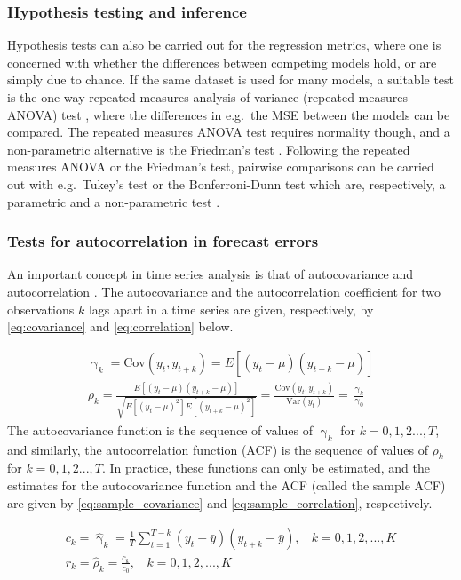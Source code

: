 \subsubsection{Hypothesis testing and inference}
Hypothesis tests can also be carried out for the regression metrics, where one is concerned with whether the differences between competing models hold, or are simply due to chance. If the same dataset is used for many models, a suitable test is the one-way repeated measures analysis of variance (repeated measures ANOVA) test \cite{Wackerly2007}, where the differences in e.g.\ the MSE between the models can be compared. The repeated measures ANOVA test requires normality though, and a non-parametric alternative is the Friedman's test \cite{Wackerly2007}. Following the repeated measures ANOVA or the Friedman's test, pairwise comparisons can be carried out with e.g.\ Tukey's test or the Bonferroni-Dunn test which are, respectively, a parametric and a non-parametric test \cite{Pereira2014}.

\subsubsection{Tests for autocorrelation in forecast errors}
\label{sec:auto_errors}
An important concept in time series analysis is that of autocovariance and autocorrelation \cite{Montgomery2015}. The autocovariance and  the autocorrelation coefficient for two observations $k$ lags apart in a time series are given, respectively, by \cref{eq:covariance} and \cref{eq:correlation} below.  

\begin{gather}
     \upgamma_k = \text{Cov}(y_t, y_{t+k}) = E[(y_t - \mu)(y_{t+k} - \mu)] \label{eq:covariance} \\[1ex]
     \rho_k = \frac{E[(y_t - \mu)(y_{t+k} - \mu)]}{\sqrt{E[(y_t - \mu)^2]E[(y_{t+k} - \mu)^2]}} = \frac{\text{Cov}(y_t, y_{t+k})}{\text{Var}(y_t)} = \frac{\upgamma_k}{\upgamma_0}\label{eq:correlation}
\end{gather}
The autocovariance function is the sequence of values of $\upgamma_k$ for $k=0,1,2 ..., T$, and similarly, the autocorrelation function (ACF) is the sequence of values of $\rho_k$ for $k=0,1,2 ..., T$. In practice, these functions can only be estimated, and the estimates for the autocovariance function and the ACF (called the sample ACF) are given by \cref{eq:sample_covariance} and \cref{eq:sample_correlation}, respectively.

\begin{gather}
     c_k=\hat{\upgamma}_k = \frac{1}{T} \sum_{t=1}^{T-k} (y_t - \bar{y})(y_{t+k} - \bar{y}), \:\:\:\: k = 0,1,2,...,K \label{eq:sample_covariance} \\[1ex]
     r_k = \hat{\rho}_k = \frac{c_k}{c_0}, \:\:\:\: k = 0,1,2,...,K \label{eq:sample_correlation}
\end{gather}

